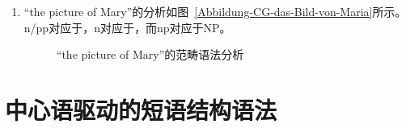 \begin{enumerate}
\item “the picture of Mary”的分析如图~\vref{Abbildung-CG-das-Bild-von-Maria}所示。n/pp对应于\nnull，n对应于\nbar ，而np对应于NP。
\begin{figure}[H]
\centerline{%
}
\caption{“the picture of Mary”\label{Abbildung-CG-das-Bild-von-Maria}的范畴语法分析}
\end{figure}%
\end{enumerate}

\pagebreak

\section{中心语驱动的短语结构语法}


